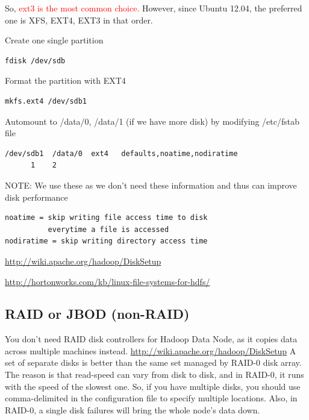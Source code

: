 So, \textcolor{red}{ext3 is the most common choice.} However, since Ubuntu
12.04, the preferred one is XFS, EXT4, EXT3 in that order.

Create one single partition
\begin{verbatim}
fdisk /dev/sdb
\end{verbatim}
Format the partition with EXT4
\begin{verbatim}
mkfs.ext4 /dev/sdb1
\end{verbatim}

Automount to /data/0, /data/1 (if we have more disk)
by modifying /etc/fstab file
\begin{verbatim}	
/dev/sdb1  /data/0  ext4   defaults,noatime,nodiratime
      1    2
\end{verbatim}
NOTE: We use these as we don't need these information and thus can improve disk
performance
\begin{verbatim}
noatime = skip writing file access time to disk
          everytime a file is accessed
nodiratime = skip writing directory access time          
\end{verbatim}

\url{http://wiki.apache.org/hadoop/DiskSetup}

\url{http://hortonworks.com/kb/linux-file-systems-for-hdfs/}

\subsection{RAID or JBOD (non-RAID)}

You don't need RAID disk controllers for Hadoop Data Node, as it copies data
across multiple machines instead.
\url{http://wiki.apache.org/hadoop/DiskSetup}
A set of separate disks is better than the same set managed by
RAID-0 disk array. The reason is that read-speed can vary from disk to disk, and
in RAID-0, it runs with the speed of the slowest one. So, if you have multiple
disks, you should use comma-delimited in the configuration file to specify
multiple locations. Also, in RAID-0, a single disk failures will bring the whole
node's data down.

